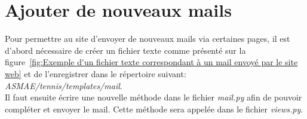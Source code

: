 \section{Ajouter de nouveaux mails}

Pour permettre au site d'envoyer de nouveaux mails via certaines pages, il est d'abord nécessaire de créer un fichier texte comme présenté sur la figure~\ref{fig:Exemple d'un fichier texte correspondant à un mail envoyé par le site web} et de l'enregistrer dans le répertoire suivant: \textit{ASMAE/tennis/templates/mail}.\\

Il faut ensuite écrire une nouvelle méthode dans le fichier \textit{mail.py} afin de pouvoir compléter et envoyer le mail. Cette méthode sera appelée dans le fichier \textit{views.py}.

